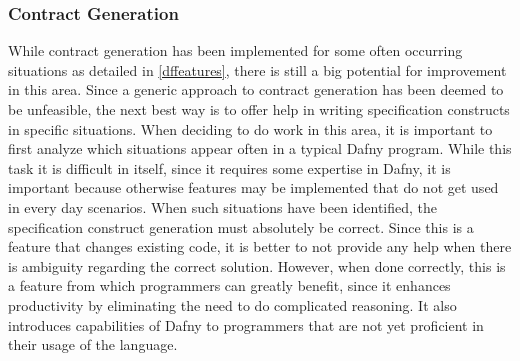 \subsubsection{Contract Generation}
While contract generation has been implemented for some often occurring situations as detailed in \ref{dffeatures}, there is still a big potential for improvement in this area. Since a generic approach to contract generation has been deemed to be unfeasible, the next best way is to offer help in writing specification constructs in specific situations.\newline
When deciding to do work in this area, it is important to first analyze which situations appear often in a typical Dafny program. While this task it is difficult in itself, since it requires some expertise in Dafny, it is important because otherwise features may be implemented that do not get used in every day scenarios. \newline
When such situations have been identified, the specification construct generation must absolutely be correct. Since this is a feature that changes existing code, it is better to not provide any help when there is ambiguity regarding the correct solution. However, when done correctly, this is a feature from which programmers can greatly benefit, since it enhances productivity by eliminating the need to do complicated reasoning. It also introduces capabilities of Dafny to programmers that are not yet proficient in their usage of the language.
